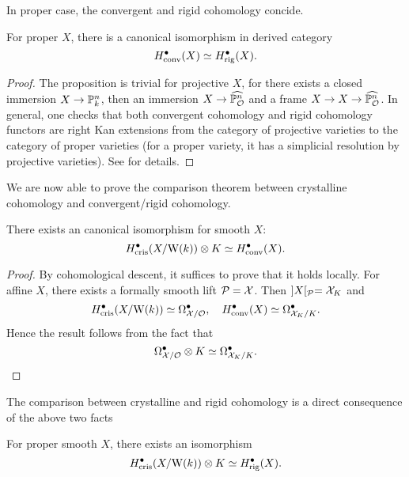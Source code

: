 In proper case, the convergent and rigid cohomology concide.
\begin{proposition}
    For proper $X$, there is a canonical isomorphism in derived category
    \[
        H^\bullet_{\mathrm{conv}}(X) \simeq H^\bullet_{\mathrm{rig}}(X).
    \]
\end{proposition}

\begin{proof}
    The proposition is trivial for projective $X$, 
    for there exists a closed immersion $X \to {\mathbb {P}}_k^n$, 
    then an immersion $X \to \widehat{{\mathbb {P}}_{\mathcal {O}}^n}$ and a frame $X \to X \to \widehat{{\mathbb {P}}_{\mathcal {O}}^n}$. 
    In general, one checks that both convergent cohomology and rigid cohomology functors 
    are right Kan extensions from the category of projective varieties 
    to the category of proper varieties 
    (for a proper variety, it has a simplicial resolution by projective varieties). 
    See \cite{Tsu} for details. 
\end{proof}

We are now able to prove the comparison theorem 
between crystalline cohomology and convergent/rigid cohomology.
\begin{theorem}
    There exists an canonical isomorphism for smooth $X$:
    \[
        H^\bullet_{\mathrm{cris}}(X/\mathrm{W}(k)) \otimes K \simeq H^\bullet_{\mathrm{conv}}(X).
    \]
\end{theorem}

\begin{proof}
    By cohomological descent, it suffices to prove that it holds locally. 
    For affine $X$, there exists a formally smooth lift ${\mathcal {P}}={\mathcal {X}}$. Then $]X[_{\mathcal {P}}={\mathcal {X}}_K$ and 
    \[
        H^\bullet_{\mathrm{cris}}(X/\mathrm{W}(k)) \simeq \Omega_{{\mathcal {X}}/{\mathcal {O}}}^\bullet, \quad H^\bullet_{\mathrm{conv}}(X) \simeq \Omega_{{\mathcal {X}}_K/K}^\bullet.
    \]
    Hence the result follows from the fact that 
    \[
        \Omega_{{\mathcal {X}}/{\mathcal {O}}}^\bullet \otimes K \simeq \Omega_{{\mathcal {X}}_K/K}^\bullet.
    \]
\end{proof}

The comparison between crystalline and rigid cohomology 
is a direct consequence of the above two facts
\begin{corollary}[\cite{Be1}]
    For proper smooth $X$, there exists an isomorphism 
    \[
        H^\bullet_{\mathrm{cris}}(X/\mathrm{W}(k)) \otimes K \simeq H^\bullet_{\mathrm{rig}}(X).
    \]
\end{corollary}

